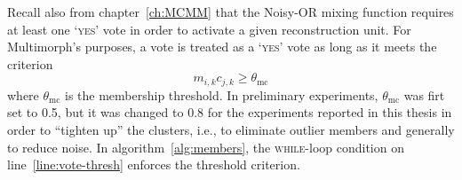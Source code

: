  Recall also from chapter~\ref{ch:MCMM} that 
the
 Noisy-OR mixing function requires at least one `\textsc{yes}' vote 
 in order to activate a given reconstruction unit.
 For Multimorph's 
 purposes, a vote is treated as a `\textsc{yes}' vote as long as it meets 
 the criterion 
 \begin{equation}\label{eq:vote-criterion}
 m_{i,k}c_{j,k} \geq \theta_{\text{mc}}
 \end{equation}
 where $\theta_{\text{mc}}$ is the membership threshold. In preliminary experiments, $\theta_{\text{mc}}$ was firt set to 0.5, but it was changed to 0.8 for the experiments reported in this thesis in order to ``tighten up'' the clusters, i.e., to eliminate outlier members and generally to reduce noise.
 In algorithm~\ref{alg:members}, the \textsc{while}-loop condition on line~\ref{line:vote-thresh} enforces the threshold criterion. 
 
